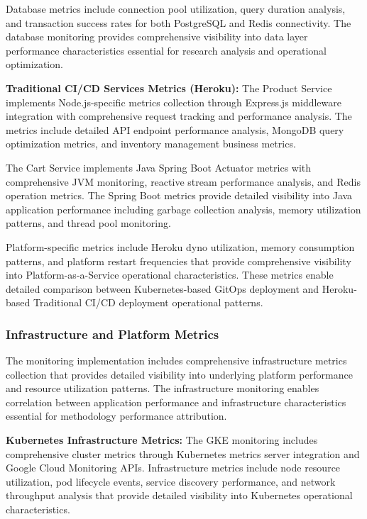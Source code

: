 Database metrics include connection pool utilization, query duration analysis, and transaction success rates for both PostgreSQL and Redis connectivity. The database monitoring provides comprehensive visibility into data layer performance characteristics essential for research analysis and operational optimization.

\textbf{Traditional CI/CD Services Metrics (Heroku):}
The Product Service implements Node.js-specific metrics collection through Express.js middleware integration with comprehensive request tracking and performance analysis. The metrics include detailed API endpoint performance analysis, MongoDB query optimization metrics, and inventory management business metrics.

The Cart Service implements Java Spring Boot Actuator metrics with comprehensive JVM monitoring, reactive stream performance analysis, and Redis operation metrics. The Spring Boot metrics provide detailed visibility into Java application performance including garbage collection analysis, memory utilization patterns, and thread pool monitoring.

Platform-specific metrics include Heroku dyno utilization, memory consumption patterns, and platform restart frequencies that provide comprehensive visibility into Platform-as-a-Service operational characteristics. These metrics enable detailed comparison between Kubernetes-based GitOps deployment and Heroku-based Traditional CI/CD deployment operational patterns.

\subsubsection{Infrastructure and Platform Metrics}

The monitoring implementation includes comprehensive infrastructure metrics collection that provides detailed visibility into underlying platform performance and resource utilization patterns. The infrastructure monitoring enables correlation between application performance and infrastructure characteristics essential for methodology performance attribution.

\textbf{Kubernetes Infrastructure Metrics:}
The GKE monitoring includes comprehensive cluster metrics through Kubernetes metrics server integration and Google Cloud Monitoring APIs. Infrastructure metrics include node resource utilization, pod lifecycle events, service discovery performance, and network throughput analysis that provide detailed visibility into Kubernetes operational characteristics.


